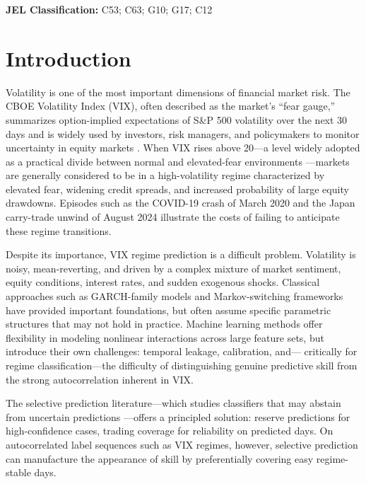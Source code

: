 \documentclass[12pt]{article}
\begin{document}
\vspace{0.5em}
\noindent\textbf{JEL Classification:} C53; C63; G10; G17; C12

\section{Introduction}

Volatility is one of the most important dimensions of financial market risk. The CBOE Volatility
Index (VIX), often described as the market's ``fear gauge,'' summarizes option-implied
expectations of S\&P 500 volatility over the next 30 days and is widely used by investors, risk
managers, and policymakers to monitor uncertainty in equity markets \citep{whaley2009}. When VIX
rises above 20---a level widely adopted as a practical divide between normal and elevated-fear
environments \citep{whaley2009}---markets are generally considered to be in a high-volatility
regime characterized by elevated fear, widening credit spreads, and increased probability of large
equity drawdowns. Episodes such as the COVID-19 crash of March 2020 and the Japan carry-trade
unwind of August 2024 illustrate the costs of failing to anticipate these regime transitions.

Despite its importance, VIX regime prediction is a difficult problem. Volatility is noisy,
mean-reverting, and driven by a complex mixture of market sentiment, equity conditions, interest
rates, and sudden exogenous shocks. Classical approaches such as GARCH-family models
\citep{bollerslev1986} and Markov-switching frameworks \citep{hamilton1989} have provided
important foundations, but often assume specific parametric structures that may not hold in
practice. Machine learning methods offer flexibility in modeling nonlinear interactions across
large feature sets, but introduce their own challenges: temporal leakage, calibration, and---
critically for regime classification---the difficulty of distinguishing genuine predictive skill
from the strong autocorrelation inherent in VIX.

The selective prediction literature---which studies classifiers that may abstain from uncertain
predictions \citep{chow1970, bartlett2008, geifman2017}---offers a principled solution: reserve
predictions for high-confidence cases, trading coverage for reliability on predicted days. On
autocorrelated label sequences such as VIX regimes, however, selective prediction can manufacture
the appearance of skill by preferentially covering easy regime-stable days.
\end{document}
